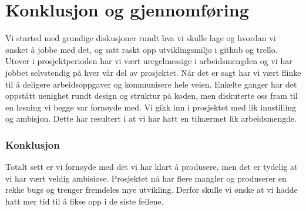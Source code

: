 \section{Konklusjon og gjennomføring}
Vi started med grundige diskusjoner rundt hva vi skulle lage og hvordan vi ønsket å jobbe med det, og satt raskt opp utviklingsmiljø i github og trello. Utover i prosjektperioden har vi vært uregelmessige i arbeidsmengden og vi har jobbet selvstendig på hver vår del av prosjektet. Når det er sagt har vi vært flinke til å deligere arbeidsoppgaver og kommunisere hele veien. Enkelte ganger har det oppstått uenighet rundt design og struktur på koden, men diskuterte oss fram til en løsning vi begge var fornøyde med. Vi gikk inn i prosjektet med lik innstilling og ambisjon. Dette har resultert i at vi har hatt en tilnærmet lik arbeidsmengde.

\subsubsection{Konklusjon}
Totalt sett er vi fornøyde med det vi har klart å produsere, men det er tydelig at vi har vært veldig ambisiøse. Prosjektet nå har flere mangler og produserer en rekke bugs og trenger fremdeles mye utvikling. Derfor skulle vi ønske at vi hadde hatt mer tid til å fikse opp i de siste feilene.